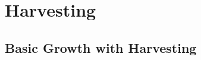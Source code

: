 \documentclass[09pt,letterpaper]{article}
\begin{document}





\section{Harvesting}

\subsection{Basic Growth with Harvesting}
\end{document}
